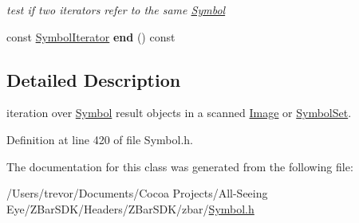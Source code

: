 \begin{DoxyCompactItemize}
\begin{DoxyCompactList}\small\item\em test if two iterators refer to the same \hyperlink{classzbar_1_1_symbol}{Symbol} \end{DoxyCompactList}\item 
\hypertarget{classzbar_1_1_symbol_iterator_a4aa4209f2fc31c07f7db4d288e90264f}{
const \hyperlink{classzbar_1_1_symbol_iterator}{SymbolIterator} {\bfseries end} () const }
\label{classzbar_1_1_symbol_iterator_a4aa4209f2fc31c07f7db4d288e90264f}

\end{DoxyCompactItemize}


\subsection{Detailed Description}
iteration over \hyperlink{classzbar_1_1_symbol}{Symbol} result objects in a scanned \hyperlink{classzbar_1_1_image}{Image} or \hyperlink{classzbar_1_1_symbol_set}{SymbolSet}. 

Definition at line 420 of file Symbol.h.



The documentation for this class was generated from the following file:\begin{DoxyCompactItemize}
\item 
/Users/trevor/Documents/Cocoa Projects/All-\/Seeing Eye/ZBarSDK/Headers/ZBarSDK/zbar/\hyperlink{_symbol_8h}{Symbol.h}\end{DoxyCompactItemize}
